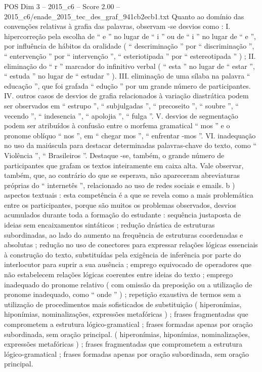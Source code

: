 \begin{textsample}{POS Dim 3 – 2015\_c6 – Score 2.00 – 2015\_c6/enade\_2015\_tec\_des\_graf\_941cb2ecb1.txt}
Quanto ao domínio das convenções relativas à grafia das palavras, observam -se desvios como : I. hipercorreção pela escolha de “ e ” no lugar de “ i ” ou de “ i ” no lugar de “ e ”, por influência de hábitos da oralidade ( “ descriminação ” por “ discriminação ”, “ entervenção ” por “ intervenção ”, “ esteriotipada ” por “ estereotipada ” ) ; II. eliminação do “ r ” marcador do infinitivo verbal ( “ esta ” no lugar de “ estar ”, “ estuda ” no lugar de “ estudar ” ).
III. eliminação de uma sílaba na palavra “ educação ”, que foi grafada “ edução ” por um grande número de participantes.
IV. outros casos de desvios de grafia relacionados à variação diastrática podem ser observados em “ estrupo ”, “ subjulgadas ”, “ precoseito ”, “ soubre ”, “ vecendo ”, “ indesencia ”, “ apolojia ”, “ fulga ”.
V. desvios de segmentação podem ser atribuídos à confusão entre o morfema gramatical “ mos ” e o pronome oblíquo “ nos ”, em “ chegar mos ”, “ enfrentar -mos ”.
VI. inadequação no uso da maiúscula para destacar determinadas palavras-chave do texto, como “ Violência ”, “ Brasileiros ”.
Destaque -se, também, o grande número de participantes que grafam os textos inteiramente em caixa alta.
Vale observar, também, que, ao contrário do que se esperava, não apareceram abreviaturas próprias do “ internetês ”, relacionado ao uso de redes sociais e emails. b ) aspectos textuais : esta competência é a que se revela como a mais problemática entre os participantes, porque são muitos os problemas observados, desvios acumulados durante toda a formação do estudante : sequência justaposta de ideias sem encaixamentos sintáticos ; redução drástica de estruturas subordinadas, ao lado do aumento na frequência de estruturas coordenadas e absolutas ; redução no uso de conectores para expressar relações lógicas essenciais à construção do texto, substituídas pela exigência de inferência por parte do interlocutor para suprir a sua ausência ; emprego equivocado de operadores que não estabelecem relações lógicas coerentes entre ideias do texto ; emprego inadequado do pronome relativo ( com omissão da preposição ou a utilização de pronome inadequado, como “ onde ” ) ; repetição exaustiva de termos sem a utilização de procedimentos mais sofisticados de substituição ( hiperonímias, hiponímias, nominalizações, expressões metafóricas ) ; frases fragmentadas que comprometem a estrutura lógico-gramatical ; frases formadas apenas por oração subordinada, sem oração principal. ( hiperonímias, hiponímias, nominalizações, expressões metafóricas ) ; frases fragmentadas que comprometem a estrutura lógico-gramatical ; frases formadas apenas por oração subordinada, sem oração principal.

\end{textsample}
